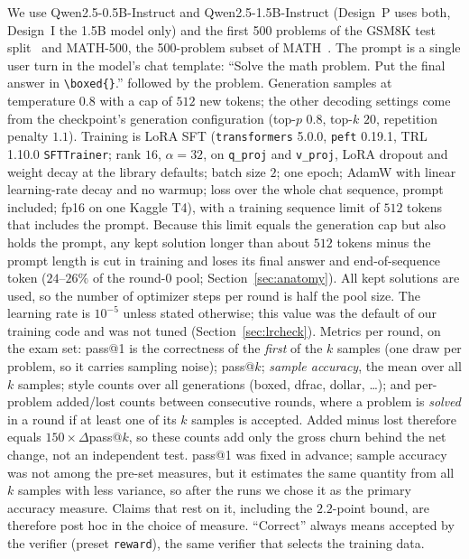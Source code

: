 \documentclass[runningheads]{llncs}
\begin{document}
We use Qwen2.5-0.5B-Instruct and Qwen2.5-1.5B-Instruct (Design~P uses both,
Design~I the 1.5B model only) and the first 500 problems of the GSM8K test
split~\cite{ref_gsm8k} and MATH-500, the 500-problem subset of
MATH~\cite{ref_math}. The prompt is a single user turn in the model's chat
template: ``Solve the math problem. Put the final answer in
\verb|\boxed{}|.'' followed by the problem. Generation samples at temperature
$0.8$ with a cap of $512$ new tokens; the other decoding settings come from the
checkpoint's generation configuration (top-$p$ $0.8$, top-$k$ $20$, repetition
penalty $1.1$). Training is LoRA SFT (\texttt{transformers} 5.0.0, \texttt{peft}
0.19.1, TRL 1.10.0 \texttt{SFTTrainer}; rank $16$, $\alpha=32$, on
\texttt{q\_proj} and \texttt{v\_proj}, LoRA dropout and weight decay at the
library defaults; batch size $2$; one epoch; AdamW with linear learning-rate
decay and no warmup; loss over the whole chat sequence, prompt included; fp16 on
one Kaggle T4), with a training sequence limit of $512$ tokens that includes the
prompt. Because this limit equals the generation cap but also holds the prompt,
any kept solution longer than about $512$ tokens minus the prompt length is cut
in training and loses its final answer and end-of-sequence token
($24$--$26\%$ of the round-0 pool; Section~\ref{sec:anatomy}). All kept
solutions are used, so the number of optimizer steps per round
is half the pool size. The learning rate is $10^{-5}$ unless stated otherwise;
this value was the default of our training code and was not tuned
(Section~\ref{sec:lrcheck}). Metrics per round, on the exam set: pass@1 is the
correctness of the \emph{first} of the $k$ samples (one draw per problem, so it
carries sampling noise); pass@$k$; \emph{sample accuracy}, the mean over all $k$
samples; style counts over all generations (boxed, dfrac, dollar, \dots); and
per-problem added/lost counts between consecutive rounds, where a problem is
\emph{solved} in a round if at least one of its $k$ samples is accepted. Added
minus lost therefore equals $150\times\Delta$pass@$k$, so these counts add only
the gross churn behind the net change, not an independent test. pass@1 was
fixed in advance; sample accuracy was not among the pre-set measures, but it
estimates the same quantity from all $k$ samples with less variance, so after
the runs we chose it as the primary accuracy measure. Claims that rest on it,
including the $2.2$-point bound, are therefore post hoc in the choice of measure. ``Correct'' always means accepted by the verifier (preset
\texttt{reward}), the same verifier that selects the training data.
\end{document}
